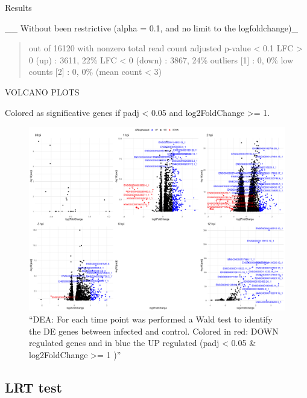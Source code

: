 \documentclass[
]{book}
\begin{document}
Results

\_\_ Without been restrictive (alpha = 0.1, and no limit to the logfoldchange)\_

\begin{quote}
out of 16120 with nonzero total read count
adjusted p-value \textless{} 0.1
LFC \textgreater{} 0 (up) : 3611, 22\%
LFC \textless{} 0 (down) : 3867, 24\%
outliers {[}1{]} : 0, 0\%
low counts {[}2{]} : 0, 0\%
(mean count \textless{} 3)
\end{quote}

VOLCANO PLOTS

Colored as significative genes if padj \textless{} 0.05 and \textbar log2FoldChange\textbar{} \textgreater= 1.

\begin{figure}
\centering
\includegraphics{images/volcanoPlots_wald_panel_thres0.05padj1lfc.png}
\caption{``DEA: For each time point was performed a Wald test to identify the DE genes between infected and control. Colored in red: DOWN regulated genes and in blue the UP regulated (padj \textless{} 0.05 \& \textbar log2FoldChange\textbar{} \textgreater= 1 )''}
\end{figure}

\hypertarget{lrt-test}{%
\subsection{LRT test}\label{lrt-test}}

  
\end{document}

